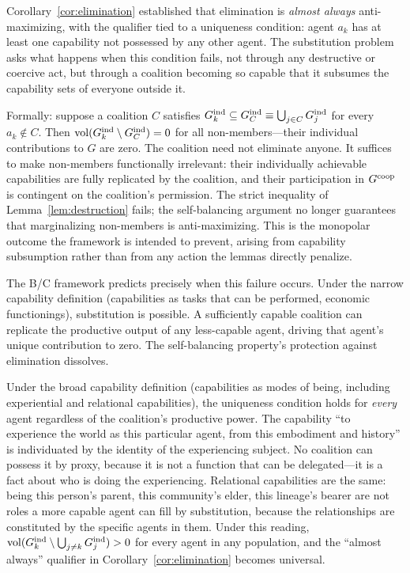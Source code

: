 Corollary~\ref{cor:elimination} established that elimination is \emph{almost
always} anti-maximizing, with the qualifier tied to a uniqueness condition:
agent $a_k$ has at least one capability not possessed by any other agent. The
substitution problem asks what happens when this condition fails, not through
any destructive or coercive act, but through a coalition becoming so capable
that it subsumes the capability sets of everyone outside it.

Formally: suppose a coalition $C$ satisfies $G_{k}^{\mathrm{ind}} \subseteq
G_C^{\mathrm{ind}} \equiv \bigcup_{j \in C} G_{j}^{\mathrm{ind}}$ for every $a_k \notin C$.
Then $\operatorname{vol}(G_{k}^{\mathrm{ind}} \setminus G_C^{\mathrm{ind}}) = 0$ for all
non-members---their individual contributions to $G$ are zero. The coalition
need not eliminate anyone. It suffices to make non-members functionally
irrelevant: their individually achievable capabilities are fully replicated by
the coalition, and their participation in $G^{\mathrm{coop}}$ is contingent on the
coalition's permission. The strict inequality of Lemma~\ref{lem:destruction}
fails; the self-balancing argument no longer guarantees that marginalizing
non-members is anti-maximizing. This is the monopolar outcome the framework is
intended to prevent, arising from capability subsumption rather than from any
action the lemmas directly penalize.

The B/C framework predicts precisely when this failure occurs. Under the narrow
capability definition (capabilities as tasks that can be performed, economic
functionings), substitution is possible. A sufficiently capable coalition can
replicate the productive output of any less-capable agent, driving that agent's
unique contribution to zero. The self-balancing property's protection against
elimination dissolves.

Under the broad capability definition (capabilities as modes of being,
including experiential and relational capabilities), the uniqueness condition
holds for \emph{every} agent regardless of the coalition's productive power.
The capability ``to experience the world as this particular agent, from this
embodiment and history'' is individuated by the identity of the experiencing
subject. No coalition can possess it by proxy, because it is not a function
that can be delegated---it is a fact about who is doing the experiencing.
Relational capabilities are the same: being this person's parent, this
community's elder, this lineage's bearer are not roles a more capable agent can
fill by substitution, because the relationships are constituted by the specific
agents in them. Under this reading, $\operatorname{vol}(G_{k}^{\mathrm{ind}} \setminus \bigcup_{j \neq k}
G_{j}^{\mathrm{ind}}) > 0$ for every agent in any population, and the ``almost always''
qualifier in Corollary~\ref{cor:elimination} becomes universal.

